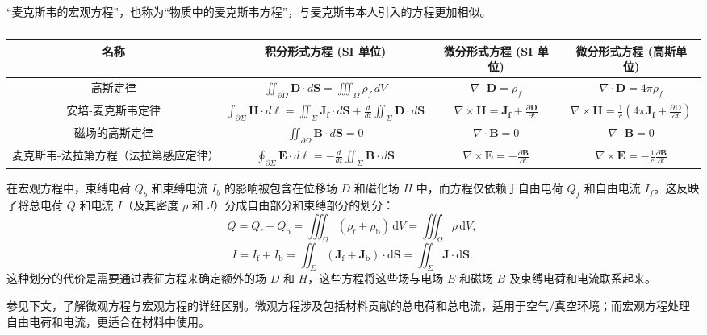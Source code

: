 “麦克斯韦的宏观方程”，也称为“物质中的麦克斯韦方程”，与麦克斯韦本人引入的方程更加相似。
\begin{table}[ht]
\centering
\caption\label{MAXS2}
\begin{tabular}{|c|c|c|c|}
\hline
\textbf{名称} & \textbf{积分形式方程 (SI 单位) } & \textbf{微分形式方程 (SI 单位)} & \textbf{微分形式方程 (高斯单位)} \\
\hline 高斯定律 & $\iint_{\partial \Omega} \mathbf{D} \cdot d\mathbf{S} = \iiint_{\Omega} \rho_f \, dV$ & $\nabla \cdot \mathbf{D} = \rho_f$ & 
$\nabla \cdot \mathbf{D} = 4\pi \rho_f$ \\
\hline 安培-麦克斯韦定律 & $\int_{\partial \Sigma} \mathbf{H} \cdot d\mathbf{\ell} = \iint_{\Sigma} \mathbf{J_f} \cdot d\mathbf{S} + \frac{d}{dt} \iint_{\Sigma} \mathbf{D} \cdot d\mathbf{S}$ & $\nabla \times \mathbf{H} = \mathbf{J_f} + \frac{\partial \mathbf{D}}{\partial t}$ & $\nabla \times \mathbf{H} = \frac{1}{c} \left( 4\pi \mathbf{J_f} + \frac{\partial \mathbf{D}}{\partial t} \right)$ \\
\hline 磁场的高斯定律 & $\iint_{\partial \Omega} \mathbf{B} \cdot d\mathbf{S} = 0$ & $\nabla \cdot \mathbf{B} = 0$ & $\nabla \cdot \mathbf{B} = 0$ \\
\hline 麦克斯韦-法拉第方程（法拉第感应定律） & $\oint_{\partial \Sigma} \mathbf{E} \cdot d\mathbf{\ell} = - \frac{d}{dt} \iint_{\Sigma} \mathbf{B} \cdot d\mathbf{S}$ & $\nabla \times \mathbf{E} = - \frac{\partial \mathbf{B}}{\partial t}$ & $\nabla \times \mathbf{E} = - \frac{1}{c} \frac{\partial \mathbf{B}}{\partial t}$ \\
\hline 
\end{tabular}
\end{table}
在宏观方程中，束缚电荷 \( Q_b \) 和束缚电流 \( I_b \) 的影响被包含在位移场 \( D \) 和磁化场 \( H \) 中，而方程仅依赖于自由电荷 \( Q_f \) 和自由电流 \( I_f \)。这反映了将总电荷 \( Q \) 和电流 \( I \)（及其密度 \( \rho \) 和 \( J \)）分成自由部分和束缚部分的划分：
\[
Q = Q_{\text{f}} + Q_{\text{b}} = \iiint _{\Omega }\left(\rho _{\text{f}}+\rho _{\text{b}}\right)\,\mathrm {d} V=\iiint _{\Omega }\rho \,\mathrm {d} V,~
\]
\[
I = I_{\text{f}} + I_{\text{b}} = \iint _{\Sigma }\left(\mathbf {J} _{\text{f}}+\mathbf {J} _{\text{b}}\right)\cdot \mathrm {d} \mathbf {S} =\iint _{\Sigma }\mathbf {J} \cdot \mathrm {d} \mathbf {S} .~
\]
这种划分的代价是需要通过表征方程来确定额外的场 \( D \) 和 \( H \)，这些方程将这些场与电场 \( E \) 和磁场 \( B \) 及束缚电荷和电流联系起来。

参见下文，了解微观方程与宏观方程的详细区别。微观方程涉及包括材料贡献的总电荷和总电流，适用于空气/真空环境；而宏观方程处理自由电荷和电流，更适合在材料中使用。
